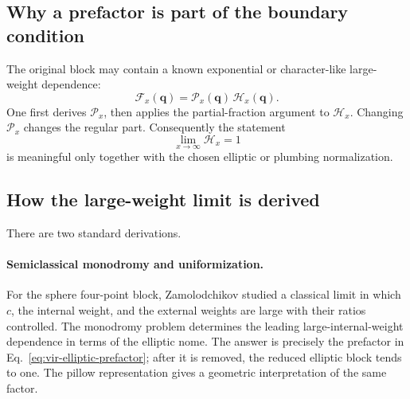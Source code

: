 \documentclass[11pt]{article}
\newcommand{\F}{\mathcal F}
\newcommand{\Hh}{\mathcal H}
\newcommand{\bvec}{\bm}
\begin{document}
\subsection{Why a prefactor is part of the boundary condition}

The original block may contain a known exponential or character-like
large-weight dependence:
\begin{equation}
 \F_x(\bvec q)
 =
 \mathcal P_x(\bvec q)\,\Hh_x(\bvec q).
 \label{eq:prefactor-and-reduced-block}
\end{equation}
One first derives \(\mathcal P_x\), then applies the partial-fraction
argument to \(\Hh_x\).  Changing \(\mathcal P_x\) changes the regular part.
Consequently the statement
\begin{equation}
 \lim_{x\to\infty}\Hh_x=1
 \end{equation}
is meaningful only together with the chosen elliptic or plumbing
normalization.

\subsection{How the large-weight limit is derived}
\label{sec:large-h-gram}

There are two standard derivations.

\paragraph{Semiclassical monodromy and uniformization.}
For the sphere four-point block, Zamolodchikov studied a classical limit in
which \(c\), the internal weight, and the external weights are large with
their ratios controlled.  The monodromy problem determines the leading
large-internal-weight dependence in terms of the elliptic nome.  The answer
is precisely the prefactor in
Eq.~\eqref{eq:vir-elliptic-prefactor}; after it is removed, the reduced
elliptic block tends to one.  The pillow representation gives a geometric
interpretation of the same factor.
\end{document}
